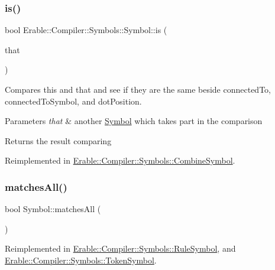 \subsubsection{\texorpdfstring{is()}{is()}}
{\footnotesize\ttfamily bool Erable\+::\+Compiler\+::\+Symbols\+::\+Symbol\+::is (\begin{DoxyParamCaption}\item[{\mbox{\hyperlink{namespace_erable_1_1_compiler_1_1_symbols_a8f0bc762f448ea4d84e8713ab3e140b9}{Symbol\+Ptr}}}]{that }\end{DoxyParamCaption})\hspace{0.3cm}{\ttfamily [virtual]}}

Compares this and that and see if they are the same beside connected\+To, connected\+To\+Symbol, and dot\+Position. 
\begin{DoxyParams}{Parameters}
{\em that} & another \mbox{\hyperlink{class_erable_1_1_compiler_1_1_symbols_1_1_symbol}{Symbol}} which takes part in the comparison \\
\hline
\end{DoxyParams}
\begin{DoxyReturn}{Returns}
the result comparing 
\end{DoxyReturn}


Reimplemented in \mbox{\hyperlink{struct_erable_1_1_compiler_1_1_symbols_1_1_combine_symbol_a3adc7ddbb9d1cb974cdd56200929911f}{Erable\+::\+Compiler\+::\+Symbols\+::\+Combine\+Symbol}}.

\mbox{\label{class_erable_1_1_compiler_1_1_symbols_1_1_symbol_a49dd91010baf238ed0d639004c3ec9ba}} 
\subsubsection{\texorpdfstring{matchesAll()}{matchesAll()}}
{\footnotesize\ttfamily bool Symbol\+::matches\+All (\begin{DoxyParamCaption}\item[{Data\+::\+Data\+Deque}]{ }\end{DoxyParamCaption})\hspace{0.3cm}{\ttfamily [virtual]}}



Reimplemented in \mbox{\hyperlink{class_erable_1_1_compiler_1_1_symbols_1_1_rule_symbol_a690e797889b403487385955dc3fe7501}{Erable\+::\+Compiler\+::\+Symbols\+::\+Rule\+Symbol}}, and \mbox{\hyperlink{class_erable_1_1_compiler_1_1_symbols_1_1_token_symbol_a89e31223762aafe7f77d545595a6e4ef}{Erable\+::\+Compiler\+::\+Symbols\+::\+Token\+Symbol}}.

